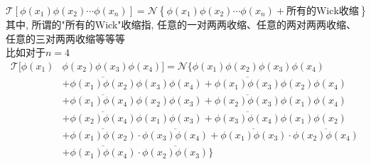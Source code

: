 \begin{theorem}[Wick定理]\label{wicksTheorem}
    \begin{equation}
        \mathcal T\left[\phi(x_1)\phi(x_2)\cdots\phi(x_n)\right]=\mathcal N\left\{\phi(x_1)\phi(x_2)\cdots\phi(x_n)+\text{所有的Wick收缩}\right\}
    \end{equation}
    其中, 所谓的"所有的Wick"收缩指, 任意的一对两两收缩、任意的两对两两收缩、任意的三对两两收缩等等等\\
    比如对于$n=4$
    \begin{equation}
        \begin{split}
            \mathcal T[\phi(x_1)&\phi(x_2)\phi(x_3)\phi(x_4)]
            =\mathcal N\{\phi(x_1)\phi(x_2)\phi(x_3)\phi(x_4)\\
            &+\overline{\phi(x_1)\phi(x_2)}\phi(x_3)\phi(x_4)+\overline{\phi(x_1)\phi(x_3)}\phi(x_2)\phi(x_4)\\
            &+\overline{\phi(x_1)\phi(x_4)}\phi(x_2)\phi(x_3)+\overline{\phi(x_2)\phi(x_3)}\phi(x_1)\phi(x_4)\\
            &+\overline{\phi(x_2)\phi(x_4)}\phi(x_1)\phi(x_3)+\overline{\phi(x_3)\phi(x_4)}\phi(x_1)\phi(x_2)\\
            &+\overline{\phi(x_1)\phi(x_2)}\cdot\overline{\phi(x_3)\phi(x_4)}+\overline{\phi(x_1)\phi(x_3)}\cdot\overline{\phi(x_2)\phi(x_4)}\\
            &+\overline{\phi(x_1)\phi(x_4)}\cdot\overline{\phi(x_2)\phi(x_3)}\}
        \end{split}
    \end{equation}
\end{theorem}
